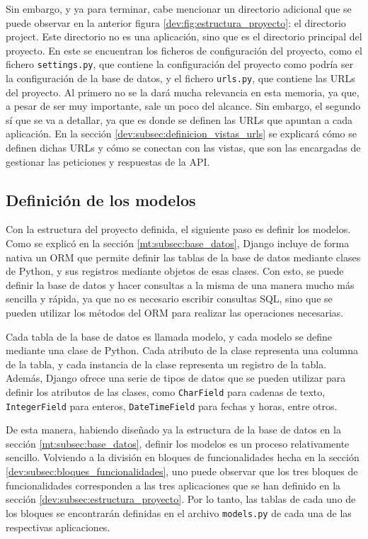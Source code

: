 Sin embargo, y ya para terminar, cabe mencionar un directorio adicional que se puede observar en la anterior figura \ref{dev:fig:estructura_proyecto}: el directorio project. Este directorio no es una aplicación, sino que es el directorio principal del proyecto. En este se encuentran los ficheros de configuración del proyecto, como el fichero \texttt{settings.py}, que contiene la configuración del proyecto como podría ser la configuración de la base de datos, y el fichero \texttt{urls.py}, que contiene las URLs del proyecto. Al primero no se la dará mucha relevancia en esta memoria, ya que, a pesar de ser muy importante, sale un poco del alcance. Sin embargo, el segundo sí que se va a detallar, ya que es donde se definen las URLs que apuntan a cada aplicación. En la sección \ref{dev:subsec:definicion_vistas_urls} se explicará cómo se definen dichas URLs y cómo se conectan con las vistas, que son las encargadas de gestionar las peticiones y respuestas de la API.

\subsection{Definición de los modelos}
\label{dev:subsec:definicion_modelos}

Con la estructura del proyecto definida, el siguiente paso es definir los modelos. Como se explicó en la sección \ref{mt:subsec:base_datos}, Django incluye de forma nativa un ORM que permite definir las tablas de la base de datos mediante clases de Python, y sus registros mediante objetos de esas clases. Con esto, se puede definir la base de datos y hacer consultas a la misma de una manera mucho más sencilla y rápida, ya que no es necesario escribir consultas SQL, sino que se pueden utilizar los métodos del ORM para realizar las operaciones necesarias.

Cada tabla de la base de datos es llamada modelo, y cada modelo se define mediante una clase de Python. Cada atributo de la clase representa una columna de la tabla, y cada instancia de la clase representa un registro de la tabla. Además, Django ofrece una serie de tipos de datos que se pueden utilizar para definir los atributos de las clases, como \texttt{CharField} para cadenas de texto, \texttt{IntegerField} para enteros, \texttt{DateTimeField} para fechas y horas, entre otros.

De esta manera, habiendo diseñado ya la estructura de la base de datos en la sección \ref{mt:subsec:base_datos}, definir los modelos es un proceso relativamente sencillo. Volviendo a la división en bloques de funcionalidades hecha en la sección \ref{dev:subsec:bloques_funcionalidades}, uno puede observar que los tres bloques de funcionalidades corresponden a las tres aplicaciones que se han definido en la sección \ref{dev:subsec:estructura_proyecto}. Por lo tanto, las tablas de cada uno de los bloques se encontrarán definidas en el archivo \texttt{models.py} de cada una de las respectivas aplicaciones.

